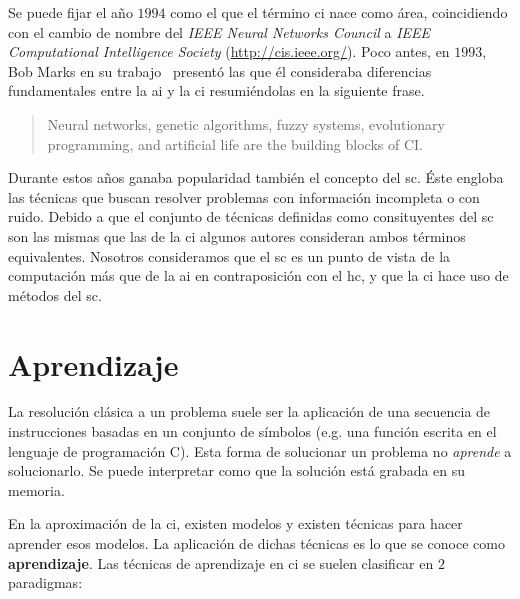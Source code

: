 Se puede fijar el año $1994$ como el que el término \ac{ci} nace como área, coincidiendo con el cambio de nombre del \textit{IEEE Neural Networks Council} a \textit{IEEE Computational Intelligence Society} (\url{http://cis.ieee.org/}). Poco antes, en $1993$, Bob Marks en su trabajo~\cite{bezdek1993intelligence} presentó las que él consideraba diferencias fundamentales entre la \ac{ai} y la \ac{ci} resumiéndolas en la siguiente frase.

\blockquote{Neural networks, genetic algorithms, fuzzy systems, evolutionary programming, and artificial life are the building blocks of CI.}

Durante estos años ganaba popularidad también el concepto del \ac{sc}. Éste engloba las técnicas que buscan resolver problemas con información incompleta o con ruido. Debido a que el conjunto de técnicas definidas como consituyentes del \ac{sc} son las mismas que las de la \ac{ci} algunos autores consideran ambos términos equivalentes. Nosotros consideramos que el \ac{sc} es un punto de vista de la computación más que de la \ac{ai} en contraposición con el \ac{hc}, y que la \ac{ci} hace uso de métodos del \ac{sc}.


\section{Aprendizaje}

La resolución clásica a un problema suele ser la aplicación de una secuencia de instrucciones basadas en un conjunto de símbolos (e.g. una función escrita en el lenguaje de programación C). Esta forma de solucionar un problema no \textit{aprende} a solucionarlo. Se puede interpretar como que la solución está grabada en su memoria.

En la aproximación de la \ac{ci}, existen modelos y existen técnicas para hacer aprender esos modelos. La aplicación de dichas técnicas es lo que se conoce como \textbf{aprendizaje}. Las técnicas de aprendizaje en \ac{ci} se suelen clasificar en $2$ paradigmas:

